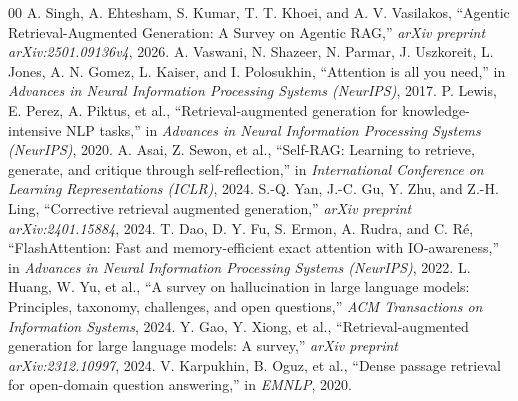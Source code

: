 \documentclass[conference]{IEEEtran}
\begin{document}
\begin{thebibliography}{00}
 A. Singh, A. Ehtesham, S. Kumar, T. T. Khoei, and A. V. Vasilakos, ``Agentic Retrieval-Augmented Generation: A Survey on Agentic RAG,'' \textit{arXiv preprint arXiv:2501.09136v4}, 2026.
 A. Vaswani, N. Shazeer, N. Parmar, J. Uszkoreit, L. Jones, A. N. Gomez, L. Kaiser, and I. Polosukhin, ``Attention is all you need,'' in \textit{Advances in Neural Information Processing Systems (NeurIPS)}, 2017.
 P. Lewis, E. Perez, A. Piktus, et al., ``Retrieval-augmented generation for knowledge-intensive NLP tasks,'' in \textit{Advances in Neural Information Processing Systems (NeurIPS)}, 2020.
 A. Asai, Z. Sewon, et al., ``Self-RAG: Learning to retrieve, generate, and critique through self-reflection,'' in \textit{International Conference on Learning Representations (ICLR)}, 2024.
 S.-Q. Yan, J.-C. Gu, Y. Zhu, and Z.-H. Ling, ``Corrective retrieval augmented generation,'' \textit{arXiv preprint arXiv:2401.15884}, 2024.
 T. Dao, D. Y. Fu, S. Ermon, A. Rudra, and C. R{\'e}, ``FlashAttention: Fast and memory-efficient exact attention with IO-awareness,'' in \textit{Advances in Neural Information Processing Systems (NeurIPS)}, 2022.
 L. Huang, W. Yu, et al., ``A survey on hallucination in large language models: Principles, taxonomy, challenges, and open questions,'' \textit{ACM Transactions on Information Systems}, 2024.
 Y. Gao, Y. Xiong, et al., ``Retrieval-augmented generation for large language models: A survey,'' \textit{arXiv preprint arXiv:2312.10997}, 2024.
 V. Karpukhin, B. Oguz, et al., ``Dense passage retrieval for open-domain question answering,'' in \textit{EMNLP}, 2020.
\end{thebibliography}
\end{document}
